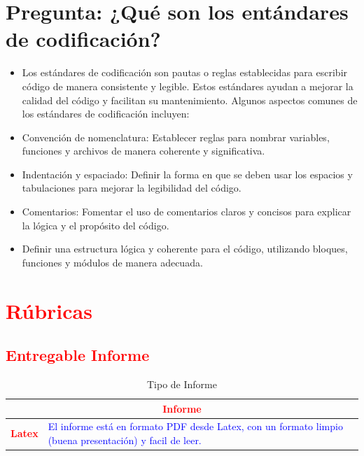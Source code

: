 \documentclass{article}
\begin{document}
	\section{Pregunta: ¿Qué son los entándares de codificación?}
	\begin{itemize}
		\item  Los estándares de codificación son pautas o reglas establecidas para escribir código de manera consistente y legible. Estos estándares ayudan a mejorar la calidad del código y facilitan su mantenimiento. Algunos aspectos comunes de los estándares de codificación incluyen:
		\item Convención de nomenclatura: Establecer reglas para nombrar variables, funciones y archivos de manera coherente y significativa.
		\item Indentación y espaciado: Definir la forma en que se deben usar los espacios y tabulaciones para mejorar la legibilidad del código.
		\item Comentarios: Fomentar el uso de comentarios claros y concisos para explicar la lógica y el propósito del código.
		\item Definir una estructura lógica y coherente para el código, utilizando bloques, funciones y módulos de manera adecuada.
	\end{itemize}	
\section{\textcolor{red}{Rúbricas}}
	
	\subsection{\textcolor{red}{Entregable Informe}}
	\begin{table}[H]
		\caption{Tipo de Informe}
		\setlength{\tabcolsep}{0.5em} %
		{\renewcommand{\arraystretch}{1.5}%
		\begin{tabular}{|p{3cm}|p{12cm}|}
			\hline
			\multicolumn{2}{|c|}{\textbf{\textcolor{red}{Informe}}}  \\
			\hline 
			\textbf{\textcolor{red}{Latex}} & \textcolor{blue}{El informe está en formato PDF desde Latex,  con un formato limpio (buena presentación) y facil de leer.}   \\ 
			\hline 
			
			
		\end{tabular}
	}
	\end{table}
\end{document}
